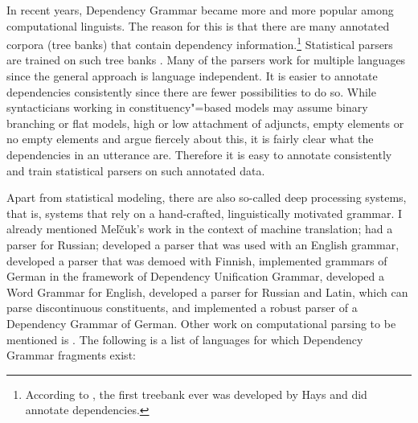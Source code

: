 


In recent years, Dependency Grammar became more and more popular among computational linguists. The
reason for this is that there are many annotated corpora (tree banks) that contain dependency
information.\footnote{%
  According to \citet{Kay2000a-u}, the first treebank ever was developed by Hays and did
  annotate dependencies.
} Statistical parsers are trained on such tree banks \citep{YM2003a-u,Attardi2006a-u,Nivre2003a-u,KMcDN2009a-u,Bohnet2010a-u}. Many of
the parsers work for multiple languages since the general approach is language independent. It is
easier to annotate dependencies consistently since there are fewer possibilities to do
so.
While
syntacticians working in constituency"=based models may assume binary branching or flat models, high
or low attachment of adjuncts, empty elements or no empty elements and argue fiercely about this,
it is fairly clear what the dependencies in an utterance are. Therefore it is easy to annotate
consistently and train statistical parsers on such annotated data.


Apart from statistical modeling, there are also so-called deep processing systems, that is, systems
that rely on a hand-crafted, linguistically motivated grammar. I already mentioned Meľčuk's work in
the context of machine translation; \citet{HZ60a-u} had a parser for Russian;
\citet{SN86a} developed a parser that was used with an English
grammar, \citet*{JLV86a-u} developed a parser that was demoed with Finnish, \citet{Hellwig86a-u,Hellwig2003a,Hellwig2006a}
implemented grammars of German in the framework of Dependency Unification Grammar, \citet{Hudson89a}
developed a Word Grammar for English,
\citet{Covington90a} developed a parser for Russian and Latin, which can parse discontinuous constituents, and
\citet{Menzel98a-u} implemented a robust parser of a Dependency Grammar of German.
Other work on computational parsing to be mentioned is
.
The following is a list of languages for which Dependency Grammar
fragments exist:

